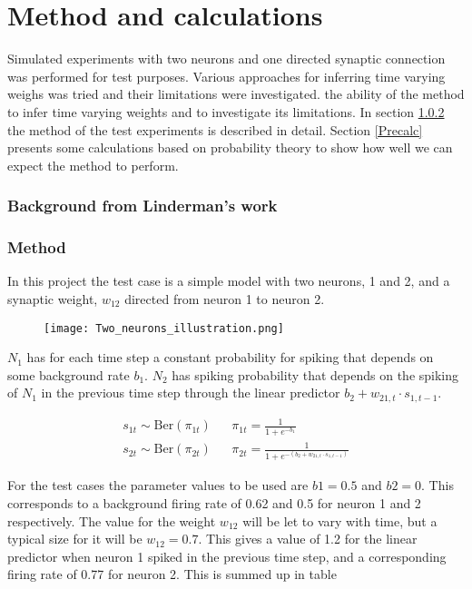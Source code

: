 
\chapter{Method and calculations}

Simulated experiments with two neurons and one directed synaptic connection was performed for test purposes. Various approaches for inferring time varying weighs was tried and their limitations were investigated.  the ability of the method to infer time varying weights and to investigate its limitations. In section \ref{Method} the method of the test experiments is described in detail. Section \ref{Precalc} presents some calculations based on probability theory to show how well we can expect the method to perform.

\subsection{Background from Linderman's work}
\label{Linderman}

\subsection{Method}
\label{Method}

In this project the test case is a simple model with two neurons, 1 and 2, and a synaptic weight, $w_{12}$ directed from neuron 1 to neuron 2.

\begin{figure}[h]
    \centering
    \texttt{[image: Two\_neurons\_illustration.png]}
\end{figure}

$N_1$ has for each time step a constant probability for spiking that depends on some background rate $b_1$. $N_2$ has spiking probability that depends on the spiking of $N_1$ in the previous time step through the linear predictor $b_2 + w_{21,t} \cdot s_{1,t-1}$. 

\begin{align*}
    s_{1t} \sim \text{Ber}(\pi_{1t}) && \pi_{1t}= \frac{1}{1+e^{-b_1}} \\
    s_{2t} \sim \text{Ber}(\pi_{2t}) && \pi_{2t}= \frac{1}{1+e^{-(b_2 + w_{21,t} \cdot s_{1,t-1})}}
\end{align*}

For the test cases the parameter values to be used are $b1 = 0.5$ and $b2 = 0$. This corresponds to a background firing rate of 0.62 and 0.5 for neuron 1 and 2 respectively. The value for the weight $w_{12}$ will be let to vary with time, but a typical size for it will be $w_{12}=0.7$. This gives a value of 1.2 for the linear predictor when neuron 1 spiked in the previous time step, and a corresponding firing rate of 0.77 for neuron 2. This is summed up in table 

